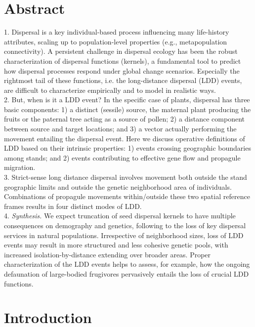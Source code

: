 \documentclass[a4paper, 12pt]{article}
\begin{document}
\section*{Abstract}
\begin{linenumbers}

1. Dispersal is a key individual-based process influencing many life-history attributes, scaling up to population-level properties (e.g., metapopulation connectivity). A persistent challenge in dispersal ecology has been the robust characterization of dispersal functions (kernels), a fundamental tool to predict how dispersal processes respond under global change scenarios. Especially the rightmost tail of these functions, i.e. the long-distance dispersal (LDD) events, are difficult to characterize empirically and to model in realistic ways. \\
2. But, when is it a LDD event? In the specific case of plants, dispersal has three basic components: 1) a distinct (sessile) source, the maternal plant producing the fruits or the paternal tree acting as a source of pollen; 2) a distance component between source and target locations; and 3) a vector actually performing the movement entailing the dispersal event. Here we discuss operative definitions of LDD based on their intrinsic properties: 1) events crossing geographic boundaries among stands; and 2) events contributing to effective gene flow and propagule migration. \\
3. Strict-sense long distance dispersal involves movement both outside the stand geographic limits and outside the genetic neighborhood area of individuals. Combinations of propagule movements within/outside these two spatial reference frames results in four distinct modes of LDD. \\
4. \textit{Synthesis.} We expect truncation of seed dispersal kernels to have multiple consequences on demography and genetics, following to the loss of key dispersal services in natural populations. Irrespective of neighborhood sizes, loss of LDD events may result in more structured and less cohesive genetic pools, with increased isolation-by-distance extending over broader areas. Proper characterization of the LDD events helps to assess, for example, how the ongoing defaunation of large-bodied frugivores pervasively entails the loss of crucial LDD functions.\\

\newpage

\section*{Introduction}


\end{linenumbers}
\end{document}
